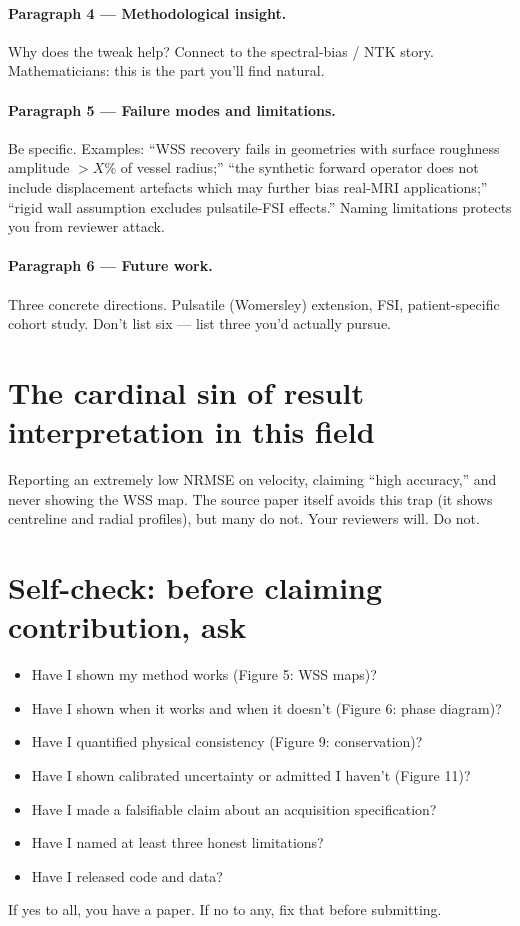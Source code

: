 \documentclass[11pt]{article}
\begin{document}
\paragraph{Paragraph 4 --- Methodological insight.} Why does the tweak help? Connect to the spectral-bias / NTK story. Mathematicians: this is the part you'll find natural.

\paragraph{Paragraph 5 --- Failure modes and limitations.} Be specific. Examples: ``WSS recovery fails in geometries with surface roughness amplitude $>X\%$ of vessel radius;'' ``the synthetic forward operator does not include displacement artefacts which may further bias real-MRI applications;'' ``rigid wall assumption excludes pulsatile-FSI effects.'' Naming limitations protects you from reviewer attack.

\paragraph{Paragraph 6 --- Future work.} Three concrete directions. Pulsatile (Womersley) extension, FSI, patient-specific cohort study. Don't list six --- list three you'd actually pursue.

\section{The cardinal sin of result interpretation in this field}

Reporting an extremely low NRMSE on velocity, claiming ``high accuracy,'' and never showing the WSS map. The source paper itself avoids this trap (it shows centreline and radial profiles), but many do not. Your reviewers will. Do not.

\section*{Self-check: before claiming contribution, ask}
\begin{itemize}[noitemsep]
\item Have I shown my method works (Figure 5: WSS maps)?
\item Have I shown when it works and when it doesn't (Figure 6: phase diagram)?
\item Have I quantified physical consistency (Figure 9: conservation)?
\item Have I shown calibrated uncertainty or admitted I haven't (Figure 11)?
\item Have I made a falsifiable claim about an acquisition specification?
\item Have I named at least three honest limitations?
\item Have I released code and data?
\end{itemize}
If yes to all, you have a paper. If no to any, fix that before submitting.
\end{document}

